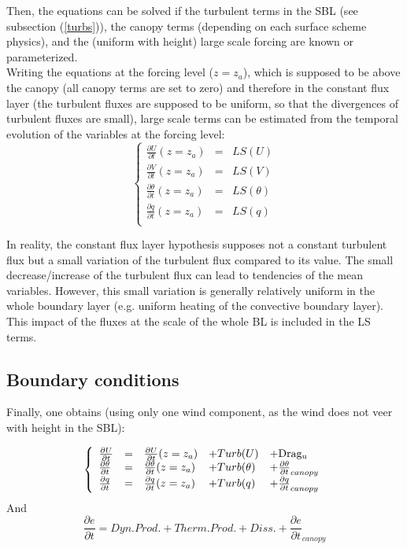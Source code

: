 Then, the equations can be solved if the turbulent terms in the SBL (see subsection (\ref{turbs})), the canopy terms (depending on each surface scheme physics), and the (uniform with height) large scale forcing are known or parameterized. \\

Writing the equations at the forcing level ($z=z_a$), which is supposed to be above the canopy (all canopy terms are set to zero) and therefore in the constant flux layer (the turbulent fluxes are supposed to be uniform, so that the divergences of turbulent fluxes are small), large scale terms can be estimated from the temporal evolution of the variables at the forcing level:
\begin{equation}
\left\{
\begin{array}{lllllll}
\frac{\partial U}{\partial t}(z=z_a) &=&LS(U) \\
\frac{\partial V}{\partial t}(z=z_a) &=&LS(V) \\
\frac{\partial \theta}{\partial t}(z=z_a) &=&LS(\theta)\\
\frac{\partial q}{\partial t}(z=z_a) &=&LS(q)\\
\end{array}
\right.\label{eq7}
\end{equation}

In reality, the constant flux layer hypothesis supposes not a constant turbulent flux but a small variation of the turbulent flux compared to its value. The small decrease/increase of the turbulent flux can lead to tendencies of the mean variables. However, this small variation is generally relatively uniform in the whole boundary layer (e.g. uniform heating of the convective boundary layer). This impact of the fluxes at the scale of the whole BL is included in the LS terms. \\

\subsection{Boundary conditions}

Finally, one obtains (using only one wind component, as the wind does not veer with height in the SBL):

\begin{equation}
\left\{
\begin{array}{lllllll}
\frac{\partial U}{\partial t} &=&\frac{\partial U}{\partial t}(z=z_a)& + Turb(U) & + {\rm Drag_u} \\
\frac{\partial \theta}{\partial t} &=&\frac{\partial \theta}{\partial t}(z=z_a)&  + Turb(\theta) & + \frac{\partial \theta}{\partial t}_{canopy}\\
\frac{\partial q}{\partial t} &=&\frac{\partial q}{\partial t}(z=z_a)&  + Turb(q) & + \frac{\partial q}{\partial t}_{canopy} \\
\end{array}
\right.\label{eq9}
\end{equation}
And
\begin{equation}
\frac{\partial e}{\partial t} = Dyn. Prod. + Therm. Prod. + Diss. + \frac{\partial e}{\partial t}_{canopy} \label{tke}
\end{equation}

